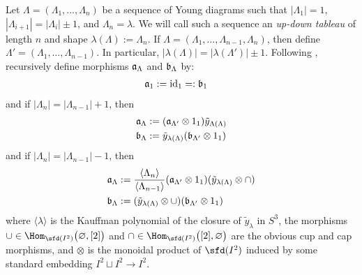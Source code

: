 Let $\Lambda = (\Lambda_1, \dots, \Lambda_n)$ be a sequence of Young diagrams such that $|\Lambda_1|=1$, $|\Lambda_{i+1}| = |\Lambda_{i}| \pm 1$, and $\Lambda_n=\lambda$. 
We will call such a sequence an \textit{up-down tableau} of length $n$ and shape $\lambda(\Lambda) := \Lambda_n$. 
If $\Lambda = (\Lambda_1, \dots, \Lambda_{n-1}, \Lambda_n)$, then define $\Lambda' = (\Lambda_1, \dots, \Lambda_{n-1})$. 
In particular, $|\lambda(\Lambda)| = |\lambda(\Lambda')| \pm 1$. Following , recursively define morphisms $\mathfrak{a}_\Lambda$ and $\mathfrak{b}_\Lambda$ by:
\begin{align*}
    \mathfrak{a}_1 &:= {\rm{id}}_1 =: \mathfrak{b}_1 
\end{align*}
and if $|\Lambda_n| = |\Lambda_{n-1}| + 1$, then 
\begin{align*}
    \mathfrak{a}_\Lambda &:= (\mathfrak{a}_{\Lambda'} \otimes 1_1) \tilde{y}_{\Lambda(\Lambda)} \\
    \mathfrak{b}_\Lambda &:= \tilde{y}_{\lambda(\Lambda)} (\mathfrak{b}_{\Lambda'} \otimes 1_1)
\end{align*}
and if $|\Lambda_n| = |\Lambda_{n-1}| - 1$, then
\begin{align*}
    \mathfrak{a}_\Lambda &:= \frac{ \langle \Lambda_n \rangle}{ \langle \Lambda_{n-1} \rangle} (\mathfrak{a}_{\Lambda'} \otimes 1_1) (\tilde{y}_{\lambda(\Lambda)} \otimes \cap) \\
    \mathfrak{b}_\Lambda &:= (\tilde{y}_{\lambda(\Lambda)} \otimes \cup) (\mathfrak{b}_{\Lambda'} \otimes 1_1)
\end{align*}
where $\langle \lambda \rangle$ is the Kauffman polynomial of the closure of $\tilde{y}_\lambda$ in $S^3$, the morphisms $\cup \in \Hom_{\sfd(I^2)} \big( \varnothing, [2] \big)$ and $\cap \in \Hom_{\sfd(I^2)} \big( [2], \varnothing \big)$ are the obvious cup and cap morphisms, and $\otimes$ is the monoidal product of $\sfd(I^2)$ induced by some standard embedding $I^2 \sqcup I^2 \to I^2$. 


